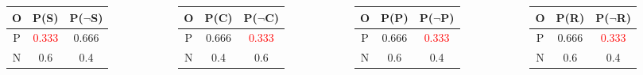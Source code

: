 \documentclass[aspectratio=169, 10pt]{beamer}
\begin{document}
\begin{frame}[t]
    \begin{columns}
        \begin{column}{0.25\textwidth}
            \begin{table}[]
                \small
                \begin{tabular}{ccc}
                O & P(S) & P($\neg$S) \\ \hline
                P & \textcolor{red}{0.333} & 0.666 \\
                N & 0.6 & 0.4 \\
                \end{tabular}
            \end{table}
        \end{column}
        \begin{column}{0.25\textwidth}
            \begin{table}[]
                \small
                \begin{tabular}{ccc}
                O & P(C) & P($\neg$C) \\ \hline
                P & 0.666 & \textcolor{red}{0.333} \\
                N & 0.4 & 0.6 \\
                \end{tabular}
            \end{table}
        \end{column}
        \begin{column}{0.25\textwidth}
            \begin{table}[]
                \small
                \begin{tabular}{ccc}
                O & P(P) & P($\neg$P) \\ \hline
                P & 0.666 & \textcolor{red}{0.333} \\
                N & 0.6 & 0.4 \\
                \end{tabular}
            \end{table}
        \end{column}
        \begin{column}{0.25\textwidth}
            \begin{table}[]
                \small
                \begin{tabular}{ccc}
                O & P(R) & P($\neg$R) \\ \hline
                P & 0.666 & \textcolor{red}{0.333} \\
                N & 0.6 & 0.4 \\
                \end{tabular}
            \end{table}
        \end{column}
    \end{columns}


\end{frame}
\end{document}
